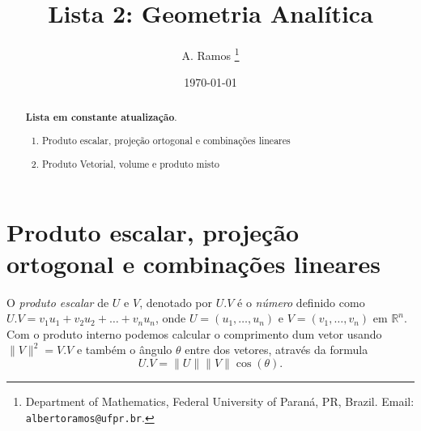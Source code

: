 \documentclass{article}
\theoremstyle{plain}
\theoremstyle{definition}
\theoremstyle{remark}
\begin{document}
\title{Lista 2: Geometria Analítica}

\author{
A. Ramos \thanks{Department of Mathematics,
    Federal University of Paraná, PR, Brazil.
    Email: {\tt albertoramos@ufpr.br}.}
}

\date{\today}
 
\maketitle

\begin{abstract}
{\bf Lista em constante atualização}.
 \begin{enumerate}
 \item Produto escalar, projeção ortogonal e combinações lineares %
 \item Produto Vetorial, volume e produto misto
 \end{enumerate}
\end{abstract}


\section{Produto escalar, projeção ortogonal e combinações lineares} 
 O {\it produto escalar} de $U$ e $V$, denotado por $U.V$ é o {\it número} definido como $ U.V = v_1u_1+v_2u_2+ \dots + v_n u_n$, onde $U=(u_1, \dots, u_n)$ e $V=(v_1, \dots, v_n)$ em $\mathbb{R}^{n}$. 
Com o produto interno podemos calcular o comprimento dum vetor usando $\|V\|^{2}=V.V$ e também o ângulo $\theta$ entre dos vetores, através da formula $$ U.V= \|U\| \|V\| \cos(\theta).$$
\end{document}
